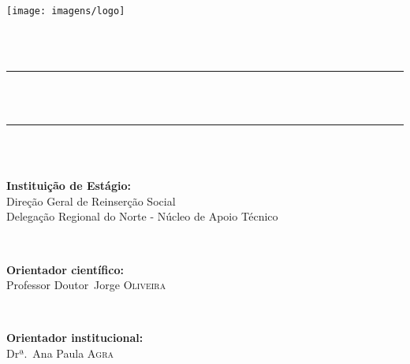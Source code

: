 
\newcommand{\HRule}{} %
\begin{titlepage}
\noindent \texttt{[image: imagens/logo]}~\\[1cm]
\begin{center}
 \textsc{\LARGE \theInstitutionName}\\[1.5cm]

\noindent \textsc{\Large \theCourseName}\\[0.5cm]

\rule{\linewidth}{0.5mm} \\[0.25cm]
{
\LARGE \bfseries
\thetitle
\\[0.4cm]
}

\rule{\linewidth}{0.5mm} \\[1cm]


\noindent \textsc{\Large \theauthor}\\[1.7cm]

\begin{flushleft}
\large
\textbf{Instituição de Estágio:}  \\
Direção Geral de Reinserção Social\\
Delegação Regional do Norte - Núcleo de Apoio Técnico

~

\textbf{Orientador científico:} \\
Professor Doutor~Jorge \textsc{Oliveira}

~

\textbf{Orientador institucional:} \\
Drª.~Ana Paula \textsc{Agra}
\end{flushleft}

\vfill

{\large \thedate}

\end{center}
\end{titlepage}